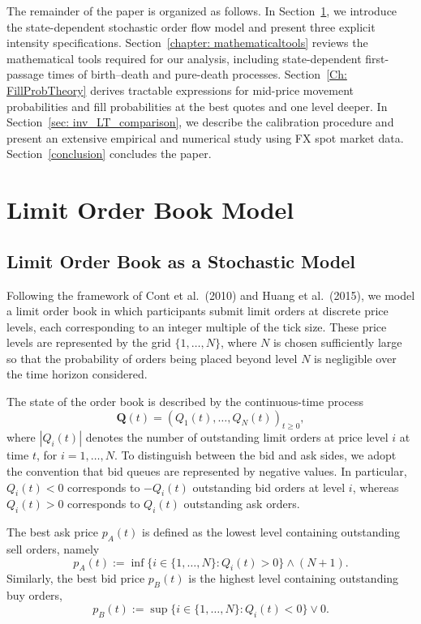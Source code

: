 \documentclass[11pt]{article}
\begin{document}
The remainder of the paper is organized as follows. In Section~\ref{chaptermodel}, we introduce the state-dependent stochastic order flow model and present three explicit intensity specifications. Section~\ref{chapter: mathematicaltools} reviews the mathematical tools required for our analysis, including state-dependent first-passage times of birth--death and pure-death processes. Section~\ref{Ch: FillProbTheory} derives tractable expressions for mid-price movement probabilities and fill probabilities at the best quotes and one level deeper. In Section~\ref{sec: inv_LT_comparison}, we describe the calibration procedure and present an extensive empirical and numerical study using FX spot market data. Section~\ref{conclusion} concludes the paper.
 

\section{Limit Order Book Model}\label{chaptermodel}
\subsection{Limit Order Book as a Stochastic Model}\label{LOBmodel}

Following the framework of Cont et al.~(2010) and Huang et al.~(2015), we model a limit order book in which participants submit limit orders at discrete price levels, each corresponding to an integer multiple of the tick size. These price levels are represented by the grid $\{1,\dots,N\}$, where $N$ is chosen sufficiently large so that the probability of orders being placed beyond level $N$ is negligible over the time horizon considered.

The state of the order book is described by the continuous-time process
\begin{equation}
\boldsymbol{Q}(t) = (Q_1(t), \dots, Q_N(t))_{t\geq 0},
\end{equation}
where $|Q_i(t)|$ denotes the number of outstanding limit orders at price level $i$ at time $t$, for $i=1,\dots,N$. To distinguish between the bid and ask sides, we adopt the convention that bid queues are represented by negative values. In particular, $Q_i(t)<0$ corresponds to $-Q_i(t)$ outstanding bid orders at level $i$, whereas $Q_i(t)>0$ corresponds to $Q_i(t)$ outstanding ask orders.

The best ask price $p_A(t)$ is defined as the lowest level containing outstanding sell orders, namely
\begin{equation}
p_A(t) := \inf\{i\in\{1,\dots,N\}: Q_i(t)>0\}\wedge (N+1).
\end{equation}
Similarly, the best bid price $p_B(t)$ is the highest level containing outstanding buy orders,
\begin{equation}
p_B(t) := \sup\{i\in\{1,\dots,N\}: Q_i(t)<0\}\vee 0.
\end{equation}
\end{document}

